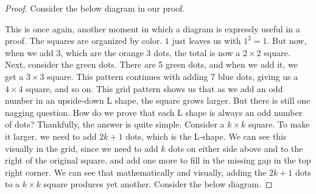 \begin{proof}
Consider the below diagram in our proof.
\begin{center}
\end{center}

This is once again, another moment in which a diagram is expressly useful in a proof. The squares are organized by color. $1$ just leaves us with $1^2 = 1$. But now, when we add 3, which are the orange 3 dots, the total is now a $ 2 \times 2$ square. Next, consider the green dots. There are 5 green dots, and when we add it, we get a $3 \times 3$ square. This pattern continues with adding 7 blue dots, giving us a $4 \times 4$ square, and so on. This grid pattern shows us that as we add an odd number in an upside-down L shape, the square grows larger. But there is still one nagging question. How do we prove that each L shape is always an odd number of dots? Thankfully, the answer is quite simple. Consider a $k \times k$ square. To make it larger, we need to add $2k+1$ dots, which is the L-shape. We can see this visually in the grid, since we need to add $k$ dots on either side above and to the right of the original square, and add one more to fill in the missing gap in the top right corner. We can see that mathematically and visually, adding the $2k+1$ dots to a $k \times k$ square produces yet another. Consider the below diagram.


\end{proof}
